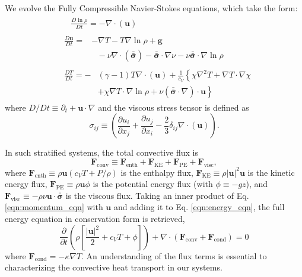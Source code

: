 \documentclass[aps, prl, twocolumn, groupedaddress, amsfonts, amssymb, amsmath]{revtex4-1}
\newcommand{\Div}[1]{\ensuremath{\nabla\cdot\left( #1\right)}}
\newcommand{\grad}{\ensuremath{\nabla}}
\newcommand{\lilstressT}{\ensuremath{\bm{\bar{\bar{\sigma}}}}}
\begin{document}
We evolve the Fully Compressible Navier-Stokes equations,
which take the form:
\begin{align}
&\begin{aligned}
&\frac{D \ln\rho}{D t} = -\Div{\bm{u}}
	\label{eqn:continuity_eqn}
\end{aligned}\\
&\begin{aligned}
\frac{D\bm{u}}{D t}=
&-\grad T - T\grad\ln\rho + \bm{g} \\
&\,\,\,\,-\nu\Div{\lilstressT} - \lilstressT\cdot\grad\nu - \nu\lilstressT\cdot\grad\ln\rho
\label{eqn:momentum_eqn}
\end{aligned}\\
&\begin{aligned}
\frac{D T}{D t} = -&(\gamma-1)T\Div{\bm{u}} + \frac{1}{c_V}\left\{ \chi\grad^2 T + \grad T \cdot \grad\chi  \right. \\ \
&+ \chi\grad T \cdot\grad\ln\rho +\nu\left(\lilstressT\cdot\nabla\right)\cdot\bm{u}\left.\right\} 
	\label{eqn:energy_eqn}
\end{aligned}
\end{align}
where $D/Dt \equiv \partial_t + \bm{u}\cdot\grad$ and the viscous stress tensor is defined as
\begin{equation}
\sigma_{ij} \equiv \left(\frac{\partial u_i}{\partial x_j} + \frac{\partial u_j}{\partial x_i} - \frac{2}{3}\delta_{ij}\Div{\bm{u}}\right).
	\label{eqn:stress_tensor}
\end{equation}

In such stratified systems, the total convective flux is
\begin{equation}
\bm{F}_{\text{conv}} \equiv \bm{F}_{\text{enth}} + \bm{F}_{\text{KE}} + \bm{F}_{\text{PE}} + \bm{F}_{\text{visc}},
\end{equation}
where $\bm{F}_{\text{enth}} \equiv \rho\bm{u}(c_V T + P/\rho)$ is the enthalpy flux, $\bm{F}_{\text{KE}} \equiv 
\rho|\bm{u}|^2\bm{u}$ is the kinetic energy flux, $\bm{F}_{\text{PE}} \equiv \rho\bm{u}\phi$ is the potential
energy flux (with $\phi \equiv -gz$), 
and $\bm{F}_{\text{visc}} \equiv -\rho\nu\bm{u}\cdot\lilstressT$ is the viscous flux.  Taking an inner product of
Eq. \ref{eqn:momentum_eqn} with $\bm{u}$ and adding it to 
Eq. \ref{eqn:energy_eqn}, the full energy equation in conservation form is retrieved,
\begin{equation}
\frac{\partial}{\partial t}\left(\rho\left[\frac{|\bm{u}|^2}{2} + c_V T + \phi\right]\right) +
\Div{\bm{F}_{\text{conv}} + \bm{F}_{\text{cond}}} = 0
	\label{eqn:energy_eqn_full}
\end{equation}
where $\bm{F}_{\text{cond}} = -\kappa \grad T$.  An understanding of the flux terms is essential to characterizing
the convective heat transport in our systems.
\end{document}
